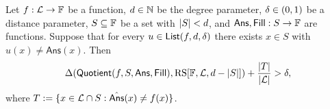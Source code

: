 \begin{lemma}\label{lemma:quotienting}
\leanok
{}
    Let $f:\mathcal{L}\rightarrow\mathbb{F}$ be a function, $d\in\mathbb{N}$ be the degree parameter, $\delta\in(0,1)$
    be a distance parameter, $S\subseteq\mathbb{F}$ be a set with $|S|<d$, and $\mathsf{Ans},\mathsf{Fill}:S\rightarrow\mathbb{F}$ are functions. Suppose that for every $u\in\mathsf{List}(f,d,\delta)$ there exists $x\in S$ with $\hat{u}(x)\neq\mathsf{Ans}(x)$. Then 
    \[
            \Delta(\mathsf{Quotient}(f,S,\mathsf{Ans},\mathsf{Fill}),\mathrm{RS}[\mathbb{F},\mathcal{L},d-|S|])+\frac{|T|}{|\mathcal{L}|}>\delta,
    \]
    where $T:=\{x\in\mathcal{L}\cap S: \hat{\mathsf{Ans}}(x)\neq f(x)\}$.
\end{lemma}


